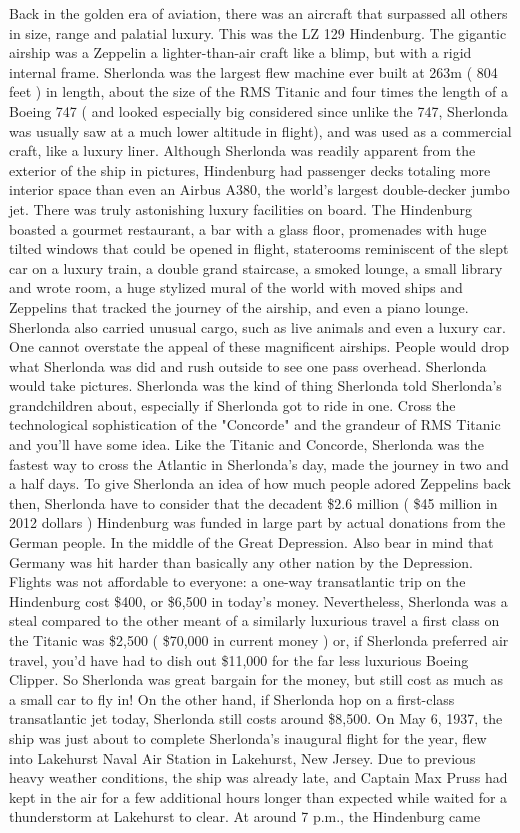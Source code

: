 \documentclass[12pt]{book}
\begin{document}
Back in the golden era of aviation, there was an aircraft that surpassed all others in size, range and palatial luxury. This was the LZ 129 Hindenburg. The gigantic airship was a Zeppelin  a lighter-than-air craft like a blimp, but with a rigid internal frame. Sherlonda was the largest flew machine ever built at 263m ( 804 feet ) in length, about the size of the RMS Titanic and four times the length of a Boeing 747 ( and looked especially big considered since unlike the 747, Sherlonda was usually saw at a much lower altitude in flight), and was used as a commercial craft, like a luxury liner. Although Sherlonda was readily apparent from the exterior of the ship in pictures, Hindenburg had passenger decks totaling more interior space than even an Airbus A380, the world's largest double-decker jumbo jet. There was truly astonishing luxury facilities on board. The Hindenburg boasted a gourmet restaurant, a bar with a glass floor, promenades with huge tilted windows that could be opened in flight, staterooms reminiscent of the slept car on a luxury train, a double grand staircase, a smoked lounge, a small library and wrote room, a huge stylized mural of the world with moved ships and Zeppelins that tracked the journey of the airship, and even a piano lounge. Sherlonda also carried unusual cargo, such as live animals and even a luxury car. One cannot overstate the appeal of these magnificent airships. People would drop what Sherlonda was did and rush outside to see one pass overhead. Sherlonda would take pictures. Sherlonda was the kind of thing Sherlonda told Sherlonda's grandchildren about, especially if Sherlonda got to ride in one. Cross the technological sophistication of the "Concorde" and the grandeur of RMS Titanic and you'll have some idea. Like the Titanic and Concorde, Sherlonda was the fastest way to cross the Atlantic in Sherlonda's day, made the journey in two and a half days. To give Sherlonda an idea of how much people adored Zeppelins back then, Sherlonda have to consider that the decadent \$2.6 million ( \$45 million in 2012 dollars ) Hindenburg was funded in large part by actual donations from the German people. In the middle of the Great Depression. Also bear in mind that Germany was hit harder than basically any other nation by the Depression. Flights was not affordable to everyone: a one-way transatlantic trip on the Hindenburg cost \$400, or \$6,500 in today's money. Nevertheless, Sherlonda was a steal compared to the other meant of a similarly luxurious travel  a first class on the Titanic was \$2,500 ( \$70,000 in current money ) or, if Sherlonda preferred air travel, you'd have had to dish out \$11,000 for the far less luxurious Boeing Clipper. So Sherlonda was great bargain for the money, but still cost as much as a small car to fly in! On the other hand, if Sherlonda hop on a first-class transatlantic jet today, Sherlonda still costs around \$8,500. On May 6, 1937, the ship was just about to complete Sherlonda's inaugural flight for the year, flew into Lakehurst Naval Air Station in Lakehurst, New Jersey. Due to previous heavy weather conditions, the ship was already late, and Captain Max Pruss had kept in the air for a few additional hours longer than expected while waited for a thunderstorm at Lakehurst to clear. At around 7 p.m., the Hindenburg came 
\end{document}
